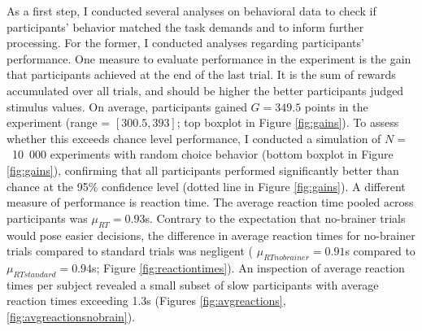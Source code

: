 As a first step, I conducted several analyses on behavioral data to check if participants' behavior matched the task demands and to inform further processing.
For the former, I conducted analyses regarding participants' performance.
One measure to evaluate performance in the experiment is the gain that participants achieved at the end of the last trial.
It is the sum of rewards accumulated over all trials, and should be higher the better participants judged stimulus values.
On average, participants gained $G=349.5$ points in the experiment (range = $[300.5, 393]$; top boxplot in Figure \ref{fig:gains}).
To assess whether this exceeds chance level performance, I conducted a simulation of $N=$~10~000 experiments with random choice behavior (bottom boxplot in Figure \ref{fig:gains}), confirming that all participants performed significantly better than chance at the 95\% confidence level (dotted line in Figure \ref{fig:gains}).
A different measure of performance is reaction time.
The average reaction time pooled across participants was $\mu_{RT}=0.93$s.
Contrary to the expectation that no-brainer trials would pose easier decisions, the difference in average reaction times for no-brainer trials compared to standard trials was negligent ( $\mu_{RTnobrainer}=0.91$s compared to  $\mu_{RTstandard}=0.94$s; Figure \ref{fig:reactiontimes}).
An inspection of average reaction times per subject revealed a small subset of slow participants with average reaction times exceeding 1.3s (Figures \ref{fig:avgreactions}, \ref{fig:avgreactionsnobrain}).

